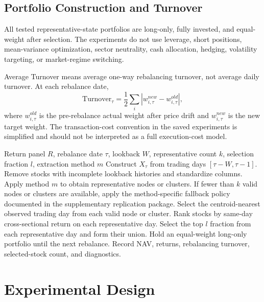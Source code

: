 \documentclass[runningheads]{llncs}
\begin{document}
\subsection{Portfolio Construction and Turnover}

All tested representative-state portfolios are long-only, fully invested, and equal-weight after selection. The experiments do not use leverage, short positions, mean-variance optimization, sector neutrality, cash allocation, hedging, volatility targeting, or market-regime switching.

Average Turnover means average one-way rebalancing turnover, not average daily turnover. At each rebalance date,
\begin{equation}
\text{Turnover}_{\tau}=\frac{1}{2}\sum_i\left|w^{new}_{i,\tau}-w^{old}_{i,\tau}\right|,
\end{equation}
where $w^{old}_{i,\tau}$ is the pre-rebalance actual weight after price drift and $w^{new}_{i,\tau}$ is the new target weight. The transaction-cost convention in the saved experiments is simplified and should not be interpreted as a full execution-cost model.

\begin{algorithm}
\caption{Representative Market-State Stock Selection at Rebalance Date $\tau$}
\label{alg:representative_market_state}
\begin{algorithmic}[1]
\REQUIRE Return panel $R$, rebalance date $\tau$, lookback $W$, representative count $k$, selection fraction $l$, extraction method $m$
\STATE Construct $X_{\tau}$ from trading days $[\tau-W,\tau-1]$.
\STATE Remove stocks with incomplete lookback histories and standardize columns.
\STATE Apply method $m$ to obtain representative nodes or clusters. If fewer than $k$ valid nodes or clusters are available, apply the method-specific fallback policy documented in the supplementary replication package.
\STATE Select the centroid-nearest observed trading day from each valid node or cluster.
\STATE Rank stocks by same-day cross-sectional return on each representative day.
\STATE Select the top $l$ fraction from each representative day and form their union.
\STATE Hold an equal-weight long-only portfolio until the next rebalance.
\STATE Record NAV, returns, rebalancing turnover, selected-stock count, and diagnostics.
\end{algorithmic}
\end{algorithm}

\section{Experimental Design}
\end{document}
